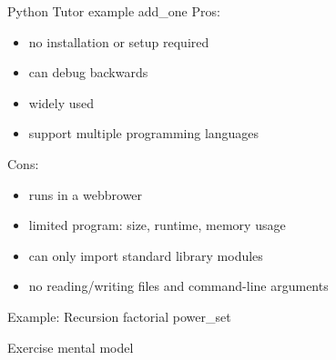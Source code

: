 \documentclass[10pt, colorlinks=true, urlcolor=blue]{beamer}
\begin{document}
\begin{frame}{Python Tutor}
  example add\_one
  Pros:
  \begin{itemize}
  \item no installation or setup required
  \item can debug backwards
  \item widely used
  \item support multiple programming languages
  \end{itemize}
  Cons:
  \begin{itemize}
  \item runs in a webbrower
  \item limited program: size, runtime, memory usage
  \item can only import standard library modules
  \item no reading/writing files and command-line arguments 
  \end{itemize}
\end{frame}

\begin{frame}{Example: Recursion}
  factorial
  power\_set
\end{frame}

\begin{frame}{Exercise}
  mental model
\end{frame}
\end{document}
